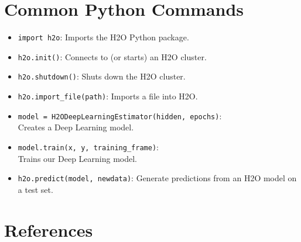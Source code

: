 {{\begin{itemize}
\end{itemize}

\section{Common Python Commands}
\begin{itemize}
\item \texttt{import h2o}:  Imports the H2O Python package.

\item \texttt{h2o.init()}:  Connects to (or starts) an H2O cluster.

\item \texttt{h2o.shutdown()}: Shuts down the H2O cluster.

\item \texttt{h2o.import\_file(path)}: Imports a file into H2O.

\item \texttt{model = H2ODeepLearningEstimator(hidden, epochs)}: \\ Creates a Deep Learning model.

\item \texttt{model.train(x, y, training\_frame)}: \\ Trains our Deep Learning model.


\item \texttt{h2o.predict(model, newdata)}: Generate predictions from an H2O model on a test set.

\end{itemize}

\newpage

\section{References}

  



}}
